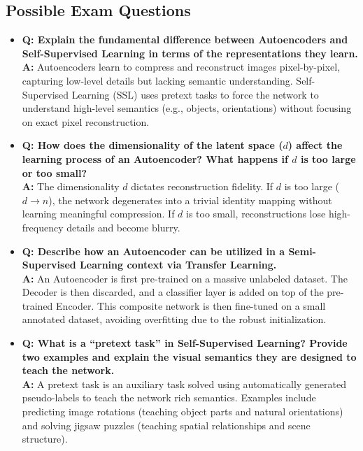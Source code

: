 \subsection{Possible Exam Questions}
\begin{itemize}
    \item \textbf{Q: Explain the fundamental difference between Autoencoders and Self-Supervised Learning in terms of the representations they learn.} \\
    \textbf{A:} Autoencoders learn to compress and reconstruct images pixel-by-pixel, capturing low-level details but lacking semantic understanding. Self-Supervised Learning (SSL) uses pretext tasks to force the network to understand high-level semantics (e.g., objects, orientations) without focusing on exact pixel reconstruction.
    
    \item \textbf{Q: How does the dimensionality of the latent space ($d$) affect the learning process of an Autoencoder? What happens if $d$ is too large or too small?} \\
    \textbf{A:} The dimensionality $d$ dictates reconstruction fidelity. If $d$ is too large ($d \to n$), the network degenerates into a trivial identity mapping without learning meaningful compression. If $d$ is too small, reconstructions lose high-frequency details and become blurry.
    
    \item \textbf{Q: Describe how an Autoencoder can be utilized in a Semi-Supervised Learning context via Transfer Learning.} \\
    \textbf{A:} An Autoencoder is first pre-trained on a massive unlabeled dataset. The Decoder is then discarded, and a classifier layer is added on top of the pre-trained Encoder. This composite network is then fine-tuned on a small annotated dataset, avoiding overfitting due to the robust initialization.
    
    \item \textbf{Q: What is a ``pretext task'' in Self-Supervised Learning? Provide two examples and explain the visual semantics they are designed to teach the network.} \\
    \textbf{A:} A pretext task is an auxiliary task solved using automatically generated pseudo-labels to teach the network rich semantics. Examples include predicting image rotations (teaching object parts and natural orientations) and solving jigsaw puzzles (teaching spatial relationships and scene structure).
    

\end{itemize}
